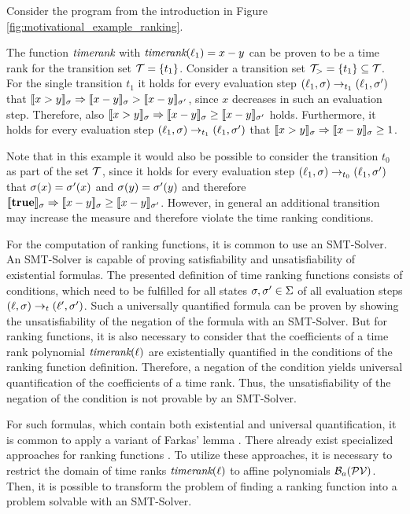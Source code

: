 \begin{example}
  Consider the program from the introduction in Figure \ref{fig:motivational_example_ranking}.
  
  The function $\emph{timerank}$ with $\emph{timerank}(\ell_1) = x-y$ can be proven to be a time rank for the transition set $\mathcal{T} = \lbrace t_1 \rbrace$.
  Consider a transition set $\mathcal{T}_> = \lbrace t_1 \rbrace \subseteq \mathcal{T}$.
  For the single transition $t_1$ it holds for every evaluation step $(\ell_1,\sigma) \rightarrow_{t_1} (\ell_1,\sigma')$ that $\llbracket x>y \rrbracket_{\sigma} \Rightarrow \llbracket x-y \rrbracket_{\sigma} > \llbracket x-y \rrbracket_{\sigma'}$, since $x$ decreases in such an evaluation step.
  Therefore, also $\llbracket x>y \rrbracket_{\sigma} \Rightarrow \llbracket x-y \rrbracket_{\sigma} \geq \llbracket x-y \rrbracket_{\sigma'}$ holds.
  Furthermore, it holds for every evaluation step $(\ell_1,\sigma) \rightarrow_{t_1} (\ell_1,\sigma')$ that $\llbracket x>y \rrbracket_{\sigma} \Rightarrow \llbracket x-y \rrbracket_{\sigma} \geq 1$.

  Note that in this example it would also be possible to consider the transition $t_0$ as part of the set $\mathcal{T}$, since it holds for every evaluation step $(\ell_1,\sigma) \rightarrow_{t_0} (\ell_1,\sigma')$ that $\sigma(x)=\sigma'(x)$ and $\sigma(y)=\sigma'(y)$ and therefore $\llbracket \textbf{true} \rrbracket_{\sigma} \Rightarrow \llbracket x-y \rrbracket_{\sigma} \geq \llbracket x-y \rrbracket_{\sigma'}$.
  However, in general an additional transition may increase the measure and therefore violate the time ranking conditions.
\end{example}

For the computation of ranking functions, it is common to use an SMT-Solver.
An SMT-Solver is capable of proving satisfiability and unsatisfiability of existential formulas.
The presented definition of time ranking functions consists of conditions, which need to be fulfilled for all states $\sigma, \sigma' \in \Sigma$ of all evaluation steps $(\ell, \sigma) \rightarrow_t (\ell', \sigma')$.
Such a universally quantified formula can be proven by showing the unsatisfiability of the negation of the formula with an SMT-Solver.
But for ranking functions, it is also necessary to consider that the coefficients of a time rank polynomial $\emph{timerank}(\ell)$ are existentially quantified in the conditions of the ranking function definition.
Therefore, a negation of the condition yields universal quantification of the coefficients of a time rank.
Thus, the unsatisfiability of the negation of the condition is not provable by an SMT-Solver.

For such formulas, which contain both existential and universal quantification, it is common to apply a variant of Farkas' lemma \cite{schrijver1998theory}.
There already exist specialized approaches for ranking functions \cite{bradley2005polyranking}.
To utilize these approaches, it is necessary to restrict the domain of time ranks $\emph{timerank}(\ell)$ to affine polynomials $\mathcal{B}_a(\mathcal{PV})$.
Then, it is possible to transform the problem of finding a ranking function into a problem solvable with an SMT-Solver.
